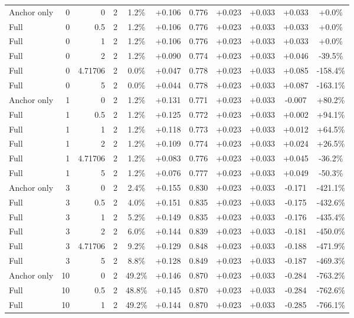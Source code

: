 \begin{table}[htbp]
\begin{tabular}{lrrrccccccc}
Anchor only & 0 & 0 & 2 & 1.2\% & +0.106 & 0.776 & +0.023 & +0.033 & +0.033 & +0.0\% \\
Full & 0 & 0.5 & 2 & 1.2\% & +0.106 & 0.776 & +0.023 & +0.033 & +0.033 & +0.0\% \\
Full & 0 & 1 & 2 & 1.2\% & +0.106 & 0.776 & +0.023 & +0.033 & +0.033 & +0.0\% \\
Full & 0 & 2 & 2 & 1.2\% & +0.090 & 0.774 & +0.023 & +0.033 & +0.046 & -39.5\% \\
Full & 0 & 4.71706 & 2 & 0.0\% & +0.047 & 0.778 & +0.023 & +0.033 & +0.085 & -158.4\% \\
Full & 0 & 5 & 2 & 0.0\% & +0.044 & 0.778 & +0.023 & +0.033 & +0.087 & -163.1\% \\
Anchor only & 1 & 0 & 2 & 1.2\% & +0.131 & 0.771 & +0.023 & +0.033 & -0.007 & +80.2\% \\
Full & 1 & 0.5 & 2 & 1.2\% & +0.125 & 0.772 & +0.023 & +0.033 & +0.002 & +94.1\% \\
Full & 1 & 1 & 2 & 1.2\% & +0.118 & 0.773 & +0.023 & +0.033 & +0.012 & +64.5\% \\
Full & 1 & 2 & 2 & 1.2\% & +0.109 & 0.774 & +0.023 & +0.033 & +0.024 & +26.5\% \\
Full & 1 & 4.71706 & 2 & 1.2\% & +0.083 & 0.776 & +0.023 & +0.033 & +0.045 & -36.2\% \\
Full & 1 & 5 & 2 & 1.2\% & +0.076 & 0.777 & +0.023 & +0.033 & +0.049 & -50.3\% \\
Anchor only & 3 & 0 & 2 & 2.4\% & +0.155 & 0.830 & +0.023 & +0.033 & -0.171 & -421.1\% \\
Full & 3 & 0.5 & 2 & 4.0\% & +0.151 & 0.835 & +0.023 & +0.033 & -0.175 & -432.6\% \\
Full & 3 & 1 & 2 & 5.2\% & +0.149 & 0.835 & +0.023 & +0.033 & -0.176 & -435.4\% \\
Full & 3 & 2 & 2 & 6.0\% & +0.144 & 0.839 & +0.023 & +0.033 & -0.181 & -450.0\% \\
Full & 3 & 4.71706 & 2 & 9.2\% & +0.129 & 0.848 & +0.023 & +0.033 & -0.188 & -471.9\% \\
Full & 3 & 5 & 2 & 8.8\% & +0.128 & 0.849 & +0.023 & +0.033 & -0.187 & -469.3\% \\
Anchor only & 10 & 0 & 2 & 49.2\% & +0.146 & 0.870 & +0.023 & +0.033 & -0.284 & -763.2\% \\
Full & 10 & 0.5 & 2 & 48.8\% & +0.145 & 0.870 & +0.023 & +0.033 & -0.284 & -762.6\% \\
Full & 10 & 1 & 2 & 49.2\% & +0.144 & 0.870 & +0.023 & +0.033 & -0.285 & -766.1\% \\

\end{tabular}
\end{table}
